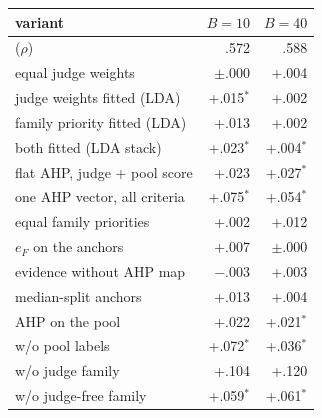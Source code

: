 \begin{tabular}{@{}lrr@{}}
\toprule
variant & $B=10$ & $B=40$ \\
\midrule
\uni{} ($\rho$) & .572 & .588 \\
\midrule
equal judge weights & $\pm$.000 & +.004 \\
judge weights fitted (LDA) & +.015$^{*}$ & +.002 \\
family priority fitted (LDA) & +.013 & +.002 \\
both fitted (LDA stack) & +.023$^{*}$ & +.004$^{*}$ \\
\addlinespace[1pt]
flat AHP, judge + pool score & +.023 & +.027$^{*}$ \\
one AHP vector, all criteria & +.075$^{*}$ & +.054$^{*}$ \\
equal family priorities & +.002 & +.012 \\
$e_F$ on the anchors & +.007 & $\pm$.000 \\
\addlinespace[1pt]
evidence without AHP map & $-$.003 & +.003 \\
median-split anchors & +.013 & +.004 \\
\addlinespace[1pt]
AHP on the pool & +.022 & +.021$^{*}$ \\
w/o pool labels & +.072$^{*}$ & +.036$^{*}$ \\
w/o judge family & +.104 & +.120 \\
w/o judge-free family & +.059$^{*}$ & +.061$^{*}$ \\
\bottomrule
\end{tabular}
